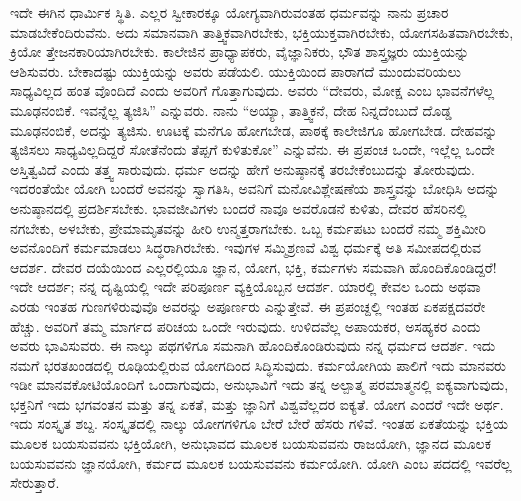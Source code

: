 ಇದೇ ಈಗಿನ ಧಾರ್ಮಿಕ ಸ್ಥಿತಿ. ಎಲ್ಲರ ಸ್ವೀಕಾರಕ್ಕೂ ಯೋಗ್ಯವಾಗಿರುವಂತಹ ಧರ್ಮವನ್ನು ನಾನು ಪ್ರಚಾರ ಮಾಡಬೇಕೆಂದಿರುವೆನು. ಅದು ಸಮಾನವಾಗಿ ತಾತ್ತ್ವಿಕವಾಗಿರಬೇಕು, ಭಕ್ತಿಯುಕ್ತವಾಗಿರಬೇಕು, ಯೋಗಸಹಿತವಾಗಿರಬೇಕು, ಕ್ರಿಯೋ ತ್ತೇಜನಕಾರಿಯಾಗಿರಬೇಕು. ಕಾಲೇಜಿನ ಪ್ರಾಧ್ಯಾಪಕರು, ವೈಜ್ಞಾನಿಕರು, ಭೌತ ಶಾಸ್ತ್ರಜ್ಞರು ಯುಕ್ತಿಯನ್ನು ಆಶಿಸುವರು. ಬೇಕಾದಷ್ಟು ಯುಕ್ತಿಯನ್ನು ಅವರು ಪಡೆಯಲಿ. ಯುಕ್ತಿಯಿಂದ ಪಾರಾಗದೆ ಮುಂದುವರಿಯಲು ಸಾಧ್ಯವಿಲ್ಲದ ಹಂತ ವೊಂದಿದೆ ಎಂದು ಅವರಿಗೆ ಗೊತ್ತಾಗುವುದು. ಅವರು “ದೇವರು, ಮೋಕ್ಷ ಎಂಬ ಭಾವನೆಗಳೆಲ್ಲ ಮೂಢನಂಬಿಕೆ. ಇವನ್ನೆಲ್ಲ ತ್ಯಜಿಸಿ” ಎನ್ನುವರು. ನಾನು “ಅಯ್ಯಾ, ತಾತ್ತ್ವಿಕನೆ, ದೇಹ ನಿನ್ನದೆಂಬುದೆ ದೊಡ್ಡ ಮೂಢನಂಬಿಕೆ, ಅದನ್ನು ತ್ಯಜಿಸು. ಊಟಕ್ಕೆ ಮನೆಗೂ ಹೋಗಬೇಡ, ಪಾಠಕ್ಕೆ ಕಾಲೇಜಿಗೂ ಹೋಗಬೇಡ. ದೇಹವನ್ನು ತ್ಯಜಿಸಲು ಸಾಧ್ಯವಿಲ್ಲದಿದ್ದರೆ ಸೋತೆನೆಂದು ತೆಪ್ಪಗೆ ಕುಳಿತುಕೋ” ಎನ್ನುವೆನು. ಈ ಪ್ರಪಂಚ ಒಂದೇ, ಇಲ್ಲೆಲ್ಲ ಒಂದೇ ಅಸ್ತಿತ್ವವಿದೆ ಎಂದು ತತ್ತ್ವ ಸಾರುವುದು. ಧರ್ಮ ಅದನ್ನು ಹೇಗೆ ಅನುಷ್ಠಾನಕ್ಕೆ ತರಬೇಕೆಂಬುದನ್ನು ತೋರುವುದು. ಇದರಂತೆಯೇ ಯೋಗಿ ಬಂದರೆ ಅವನನ್ನು ಸ್ವಾಗತಿಸಿ, ಅವನಿಗೆ ಮನೋವಿಶ್ಲೇಷಣೆಯ ಶಾಸ್ತ್ರವನ್ನು ಬೋಧಿಸಿ ಅದನ್ನು ಅನುಷ್ಠಾನದಲ್ಲಿ ಪ್ರದರ್ಶಿಸಬೇಕು. ಭಾವಜೀವಿಗಳು ಬಂದರೆ ನಾವೂ ಅವರೊಡನೆ ಕುಳಿತು, ದೇವರ ಹೆಸರಿನಲ್ಲಿ ನಗಬೇಕು, ಅಳಬೇಕು, ಪ್ರೇಮಾಮೃತವನ್ನು ಹೀರಿ ಉನ್ಮತ್ತರಾಗಬೇಕು. ಒಬ್ಬ ಕರ್ಮಪಟು ಬಂದರೆ ನಮ್ಮ ಶಕ್ತಿಮೀರಿ ಅವನೊಂದಿಗೆ ಕರ್ಮಮಾಡಲು ಸಿದ್ಧರಾಗಿರಬೇಕು. ಇವುಗಳ ಸಮ್ಮಿಶ್ರಣವೆ ವಿಶ್ವ ಧರ್ಮಕ್ಕೆ ಅತಿ ಸಮೀಪದಲ್ಲಿರುವ ಆದರ್ಶ. ದೇವರ ದಯೆಯಿಂದ ಎಲ್ಲರಲ್ಲಿಯೂ ಜ್ಞಾನ, ಯೋಗ, ಭಕ್ತಿ, ಕರ್ಮಗಳು ಸಮವಾಗಿ ಹೊಂದಿಕೊಂಡಿದ್ದರೆ! ಇದೇ ಆದರ್ಶ; ನನ್ನ ದೃಷ್ಟಿಯಲ್ಲಿ ಇದೇ ಪರಿಪೂರ್ಣ ವ್ಯಕ್ತಿಯೊಬ್ಬನ ಆದರ್ಶ. ಯಾರಲ್ಲಿ ಕೇವಲ ಒಂದು ಅಥವಾ ಎರಡು ಇಂತಹ ಗುಣಗಳಿರುವುವೊ ಅವರನ್ನು ಅಪೂರ್ಣರು ಎನ್ನುತ್ತೇವೆ. ಈ ಪ್ರಪಂಚ್ದಲ್ಲಿ ಇಂತಹ ಏಕಪಕ್ಷದವರೇ ಹೆಚ್ಚು. ಅವರಿಗೆ ತಮ್ಮ ಮಾರ್ಗದ ಪರಿಚಯ ಒಂದೇ ಇರುವುದು. ಉಳಿದವೆಲ್ಲ ಅಪಾಯಕರ, ಅಸಹ್ಯಕರ ಎಂದು ಅವರು ಭಾವಿಸುವರು. ಈ ನಾಲ್ಕು ಪಥಗಳಿಗೂ ಸಮನಾಗಿ ಹೊಂದಿಕೊಂಡಿರುವುದು ನನ್ನ ಧರ್ಮದ ಆದರ್ಶ. ಇದು ನಮಗೆ ಭರತಖಂಡದಲ್ಲಿ ರೂಢಿಯಲ್ಲಿರುವ ಯೋಗದಿಂದ ಸಿದ್ಧಿಸುವುದು. ಕರ್ಮಯೋಗಿಯ ಪಾಲಿಗೆ ಇದು ಮಾನವರು ಇಡೀ ಮಾನವಕೋಟಿಯೊಂದಿಗೆ ಒಂದಾಗುವುದು, ಅನುಭಾವಿಗೆ ಇದು ತನ್ನ ಅಲ್ಪಾತ್ಮ ಪರಮಾತ್ಮನಲ್ಲಿ ಐಕ್ಯವಾಗುವುದು, ಭಕ್ತನಿಗೆ ಇದು ಭಗವಂತನ ಮತ್ತು ತನ್ನ ಏಕತೆ, ಮತ್ತು ಜ್ಞಾನಿಗೆ ವಿಶ್ವವೆಲ್ಲದರ ಐಕ್ಯತೆ. ಯೋಗ ಎಂದರೆ ಇದೇ ಅರ್ಥ. ಇದು ಸಂಸ್ಕೃತ ಶಬ್ದ. ಸಂಸ್ಕೃತದಲ್ಲಿ ನಾಲ್ಕು ಯೋಗಗಳಿಗೂ ಬೇರೆ ಬೇರೆ ಹೆಸರು ಗಳಿವೆ. ಇಂತಹ ಏಕತೆಯನ್ನು ಭಕ್ತಿಯ ಮೂಲಕ ಬಯಸುವವನು ಭಕ್ತಿಯೋಗಿ, ಅನುಭಾವದ ಮೂಲಕ ಬಯಸುವವನು ರಾಜಯೋಗಿ, ಜ್ಞಾನದ ಮೂಲಕ ಬಯಸುವವನು ಜ್ಞಾನಯೋಗಿ, ಕರ್ಮದ ಮೂಲಕ ಬಯಸುವವನು ಕರ್ಮಯೋಗಿ. ಯೋಗಿ ಎಂಬ ಪದದಲ್ಲಿ ಇವರೆಲ್ಲ ಸೇರುತ್ತಾರೆ.

